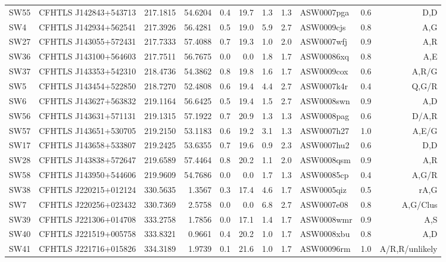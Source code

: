\documentclass[useAMS,usenatbib,a4paper]{mn2e}
\begin{document}
\begin{center}
\begin{longtable}{llrrrrrrlrr}
SW55 & CFHTLS J142843+543713 &  217.1815 &   54.6204 &  0.4 & 19.7 &  1.3 &  1.3 & ASW0007pga &  0.6  &  D,D   \\
 SW4 & CFHTLS J142934+562541 &  217.3926 &   56.4281 &  0.5 & 19.0 &  5.9 &  2.7 & ASW0009cjs &  0.8  &  A,G   \\
SW27 & CFHTLS J143055+572431 &  217.7333 &   57.4088 &  0.7 & 19.3 &  1.0 &  2.0 & ASW0007wfj &  0.9  &  A,R   \\
SW36 & CFHTLS J143100+564603 &  217.7511 &   56.7675 &  0.0 &  0.0 &  1.8 &  1.7 & ASW00086xq &  0.8  &  A,E   \\
SW37 & CFHTLS J143353+542310 &  218.4736 &   54.3862 &  0.8 & 19.8 &  1.6 &  1.7 & ASW0009cox &  0.6  &  A,R/G   \\
 SW5 & CFHTLS J143454+522850 &  218.7270 &   52.4808 &  0.6 & 19.4 &  4.4 &  2.7 & ASW0007k4r &  0.4  &  Q,G/R   \\
 SW6 & CFHTLS J143627+563832 &  219.1164 &   56.6425 &  0.5 & 19.4 &  1.5 &  2.7 & ASW0008swn &  0.9  &  A,D   \\
SW56 & CFHTLS J143631+571131 &  219.1315 &   57.1922 &  0.7 & 20.9 &  1.3 &  1.3 & ASW0008pag &  0.6  &  D/A,R   \\
SW57 & CFHTLS J143651+530705 &  219.2150 &   53.1183 &  0.6 & 19.2 &  3.1 &  1.3 & ASW0007h27 &  1.0  &  A,E/G   \\
SW17 & CFHTLS J143658+533807 &  219.2425 &   53.6355 &  0.7 & 19.6 &  0.9 &  2.3 & ASW0007hu2 &  0.6  &  D,D   \\
SW28 & CFHTLS J143838+572647 &  219.6589 &   57.4464 &  0.8 & 20.2 &  1.1 &  2.0 & ASW0008qsm &  0.9  &  A,R   \\
SW58 & CFHTLS J143950+544606 &  219.9609 &   54.7686 &  0.0 &  0.0 &  1.7 &  1.3 & ASW00085cp &  0.4  &  A,G/R   \\
SW38 & CFHTLS J220215+012124 &  330.5635 &    1.3567 &  0.3 & 17.4 &  4.6 &  1.7 & ASW0005qiz &  0.5  &  rA,G   \\
 SW7 & CFHTLS J220256+023432 &  330.7369 &    2.5758 &  0.0 &  0.0 &  6.8 &  2.7 & ASW0007e08 &  0.8  &  A,G/Clus   \\
SW39 & CFHTLS J221306+014708 &  333.2758 &    1.7856 &  0.0 & 17.1 &  1.4 &  1.7 & ASW0008wmr &  0.9  &  A,S   \\
SW40 & CFHTLS J221519+005758 &  333.8321 &    0.9661 &  0.4 & 20.2 &  1.0 &  1.7 & ASW0008xbu &  0.8  &  A,D   \\
SW41 & CFHTLS J221716+015826 &  334.3189 &    1.9739 &  0.1 & 21.6 &  1.0 &  1.7 & ASW00096rm &  1.0  &  A/R,R/unlikely   \\
\end{longtable}
\end{center}
\end{document}
